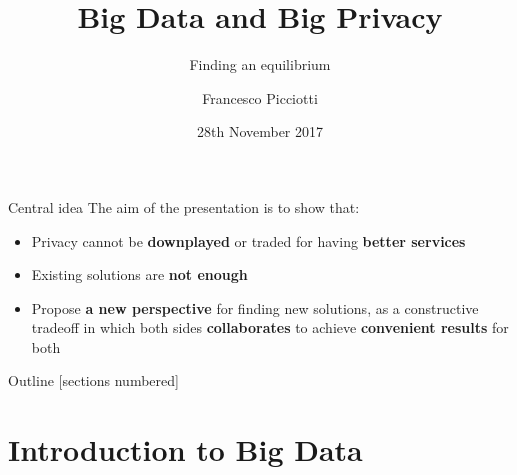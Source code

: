 \documentclass[11pt, british]{beamer}
\title{Big Data and Big Privacy}
\subtitle{Finding an equilibrium}
\date{28th November 2017}
\author{Francesco Picciotti}
\institute{Computer Ethics (2017-18), Politecnico di Milano}
\begin{document}
	
	\maketitle

	\begin{frame}{Central idea}
		The aim of the presentation is to show that:
		\begin{itemize}
			\item Privacy cannot be \textbf{downplayed} or traded for having 
			\textbf{better services}
			\item Existing solutions are \textbf{not enough}
			\item Propose \textbf{a new perspective} for finding new solutions, 
			as a \alert{constructive tradeoff} in which both sides 
			\textbf{collaborates} to achieve \textbf{convenient results} for 
			both    
		\end{itemize}
	\end{frame}
	
	\begin{frame}{Outline}
		[sections numbered]
		\tableofcontents[hideallsubsections]
	\end{frame}
	
	\section{Introduction to Big Data}

	
\end{document}
